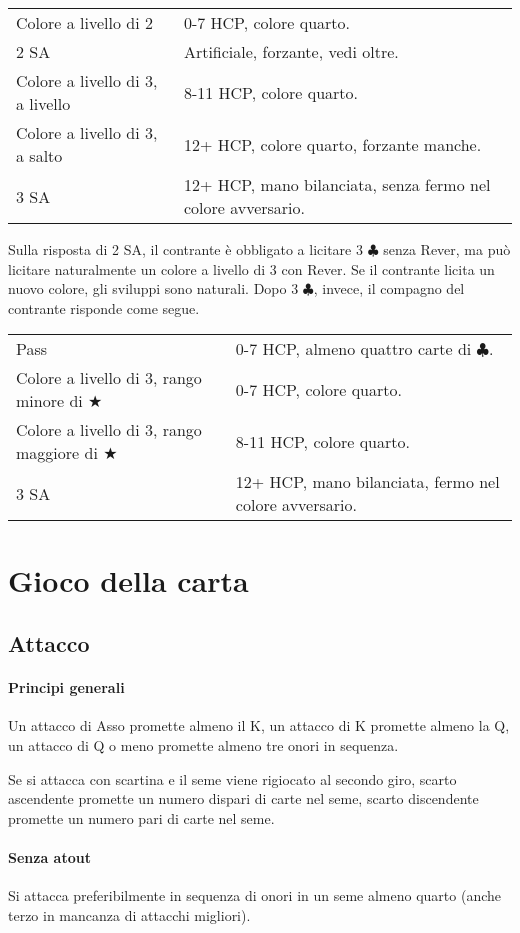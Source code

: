 \documentclass[a4paper,10pt]{article}
\renewcommand{\c}{$\clubsuit$\xspace}
\renewcommand{\j}{$\bigstar$\xspace}
\newcommand{\sa}{SA\xspace}
\newcommand{\smallspace}{\vskip0.3cm}
\newenvironment{twocol}
  {\smallspace\noindent\begin{tabular}{l p{0.78\textwidth}}}
  {\end{tabular}\smallspace}
\begin{document}
\begin{twocol}
	Colore a livello di 2 & 0-7 HCP, colore quarto. \\
	2 \sa & Artificiale, forzante, vedi oltre. \\
	Colore a livello di 3, a livello & 8-11 HCP, colore quarto. \\
	Colore a livello di 3, a salto & 12+ HCP, colore quarto, forzante manche. \\
	3 \sa & 12+ HCP, mano bilanciata, senza fermo nel colore avversario.
\end{twocol}

Sulla risposta di 2 \sa, il contrante è obbligato a licitare 3 \c senza Rever, ma può licitare naturalmente un colore a livello di 3 con Rever. Se il contrante licita un nuovo colore, gli sviluppi sono naturali. Dopo 3 \c, invece, il compagno del contrante risponde come segue.

\begin{twocol}
	Pass & 0-7 HCP, almeno quattro carte di \c. \\
	Colore a livello di 3, rango minore di \j & 0-7 HCP, colore quarto. \\
	Colore a livello di 3, rango maggiore di \j & 8-11 HCP, colore quarto. \\
	3 \sa & 12+ HCP, mano bilanciata, fermo nel colore avversario.
\end{twocol}

\pagebreak

\section{Gioco della carta}

\subsection{Attacco}

\paragraph{Principi generali} Un attacco di Asso promette almeno il K, un attacco di K promette almeno la Q, un attacco di Q o meno promette almeno tre onori in sequenza.

Se si attacca con scartina e il seme viene rigiocato al secondo giro, scarto ascendente promette un numero dispari di carte nel seme, scarto discendente promette un numero pari di carte nel seme.

\paragraph{Senza atout} Si attacca preferibilmente in sequenza di onori in un seme almeno quarto (anche terzo in mancanza di attacchi migliori).
\end{document}

